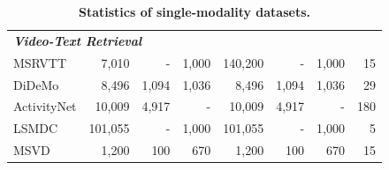 \begin{table}[tp]
{\begin{tabular}{lrrrrrrr}
        \midrule
        \multicolumn{3}{l}{\textit{\textbf{Video-Text Retrieval}}} & & & & & \\
        MSRVTT & 7,010 & - & 1,000 & 140,200 & - & 1,000 & 15 \\
        DiDeMo & 8,496 & 1,094 & 1,036 & 8,496 & 1,094 & 1,036 & 29 \\
        ActivityNet & 10,009 & 4,917 & - & 10,009 & 4,917 & - & 180 \\
        LSMDC & 101,055 & - & 1,000 & 101,055 & - & 1,000 & 5 \\
        MSVD & 1,200 & 100 & 670 & 1,200 & 100 & 670 & 15 \\
        \bottomrule
        \end{tabular}
    }
    \caption{\textbf{Statistics of single-modality datasets.}
    }
    \label{tab:statics_downstream}
    \vspace{-0.1cm}
\end{table}
